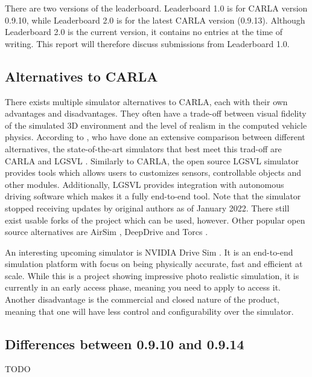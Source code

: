 There are two versions of the leaderboard. Leaderboard 1.0 is for CARLA version 0.9.10, while Leaderboard 2.0 is for the latest CARLA version (0.9.13). Although Leaderboard 2.0 is the current version, it contains no entries at the time of writing. This report will therefore discuss submissions from Leaderboard 1.0.


\subsection{Alternatives to CARLA}
There exists multiple simulator alternatives to CARLA, each with their own advantages and disadvantages. They often have a trade-off between visual fidelity of the simulated 3D environment and the level of realism in the computed vehicle physics. According to \textcite{carla-an-inside-out}, who have done an extensive comparison between different alternatives, the state-of-the-art simulators that best meet this trad-off are CARLA and LGSVL \cite{LGSVL-simulator}. Similarly to CARLA, the open source LGSVL simulator provides tools which allows users to customizes sensors, controllable objects and other modules. Additionally, LGSVL provides integration with autonomous driving software which makes it a fully end-to-end tool. Note that the simulator stopped receiving updates by original authors as of January 2022. There still exist usable forks of the project which can be used, however. Other popular open source alternatives are AirSim \cite{airsim}, DeepDrive \cite{deepdrive} and Torcs \cite{torcs}.

An interesting upcoming simulator is NVIDIA Drive Sim \cite{nvidia-drive-sim}. It is an end-to-end simulation platform with focus on being physically accurate, fast and efficient at scale. While this is a project showing impressive photo realistic simulation, it is currently in an early access phase, meaning you need to apply to access it. Another disadvantage is the commercial and closed nature of the product, meaning that one will have less control and configurability over the simulator.



\subsection{Differences between 0.9.10 and 0.9.14}
TODO
